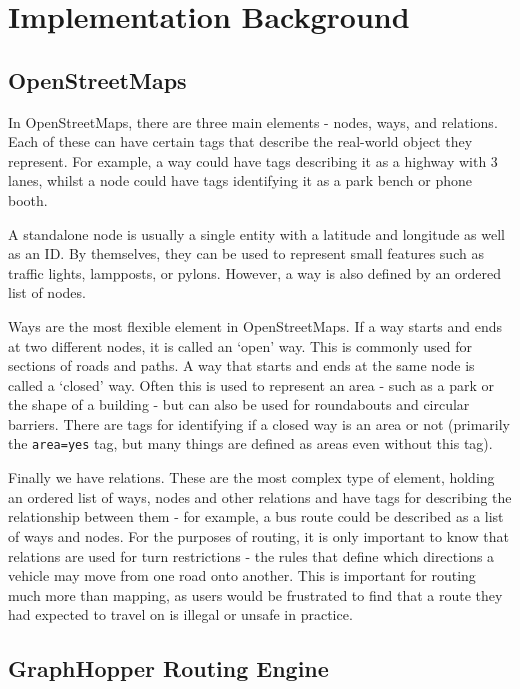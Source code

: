 \documentclass[ %
                    author={Alexander Hill},
                supervisor={Dr. Benjamin Sach},
                    degree={MEng},
                     title={MARMOSET},
                  subtitle={Multi-Agent Route Management using Online Simulation for Efficient Transportation},
                      type={research},
                      year={2016} ]{dissertation}
\begin{document}
\section{Implementation Background}

\subsection{OpenStreetMaps}

In OpenStreetMaps, there are three main elements - nodes, ways, and relations.
Each of these can have certain tags that describe the real-world object they
represent. For example, a way could have tags describing it as a highway with 3
lanes, whilst a node could have tags identifying it as a park bench or phone
booth.

A standalone node is usually a single entity with a latitude and longitude as
well as an ID. By themselves, they can be used to represent small features such
as traffic lights, lampposts, or pylons. However, a way is also defined by an
ordered list of nodes.

Ways are the most flexible element in OpenStreetMaps. If a way starts and ends
at two different nodes, it is called an `open' way. This is commonly used for
sections of roads and paths. A way that starts and ends at the same node is
called a `closed' way. Often this is used to represent an area - such as a park
or the shape of a building - but can also be used for roundabouts and circular
barriers. There are tags for identifying if a closed way is an area or not
(primarily the \texttt{area=yes} tag, but many things are defined as areas even
without this tag).

Finally we have relations. These are the most complex type of element, holding
an ordered list of ways, nodes and other relations and have tags for describing
the relationship between them - for example, a bus route could be described as a
list of ways and nodes. For the purposes of routing, it is only important to
know that relations are used for turn restrictions - the rules that define which
directions a vehicle may move from one road onto another. This is important for
routing much more than mapping, as users would be frustrated to find that a
route they had expected to travel on is illegal or unsafe in practice.

\subsection{GraphHopper Routing Engine}
\end{document}
